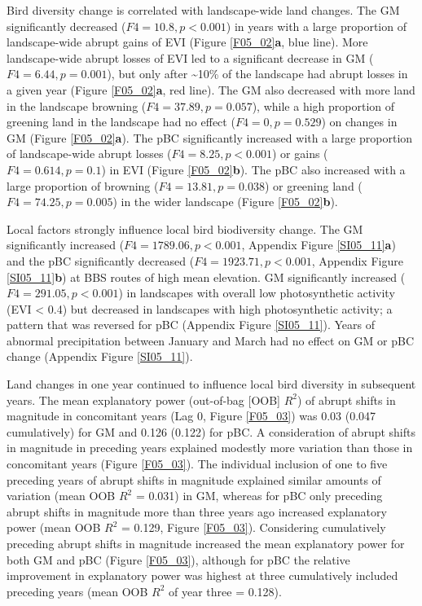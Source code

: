 Bird diversity change is correlated with landscape-wide land changes. The GM significantly decreased ($F4 = 10.8, p < 0.001$) in years with a large proportion of landscape-wide abrupt gains of EVI (Figure \ref{F05_02}\textbf{a}, blue line). More landscape-wide abrupt losses of EVI led to a significant decrease in GM ($F4 = 6.44, p = 0.001$), but only after \textasciitilde 10\% of the landscape had abrupt losses in a given year (Figure \ref{F05_02}\textbf{a}, red line). The GM also decreased with more land in the landscape browning ($F4 = 37.89, p = 0.057$), while a high proportion of greening land in the landscape had no effect ($F4 = 0, p = 0.529$) on changes in GM (Figure \ref{F05_02}\textbf{a}). The pBC significantly increased with a large proportion of landscape-wide abrupt losses ($F4 = 8.25, p < 0.001$) or gains ($F4 = 0.614, p = 0.1$) in EVI (Figure \ref{F05_02}\textbf{b}). The pBC also increased with a large proportion of browning ($F4 = 13.81, p = 0.038$) or greening land ($F4 = 74.25, p = 0.005$) in the wider landscape (Figure \ref{F05_02}\textbf{b}).

Local factors strongly influence local bird biodiversity change. The GM significantly increased ($F4 = 1789.06, p < 0.001$, Appendix Figure \ref{SI05_11}\textbf{a}) and the pBC significantly decreased ($F4 = 1923.71, p < 0.001$, Appendix Figure \ref{SI05_11}\textbf{b}) at BBS routes of high mean elevation. GM significantly increased ($F4 = 291.05, p < 0.001$) in landscapes with overall low photosynthetic activity (EVI < 0.4) but decreased in landscapes with high photosynthetic activity; a pattern that was reversed for pBC (Appendix Figure \ref{SI05_11}). Years of abnormal precipitation between January and March had no effect on GM or pBC change (Appendix Figure \ref{SI05_11}).

Land changes in one year continued to influence local bird diversity in subsequent years. The mean explanatory power (out-of-bag [OOB] $R^2$) of abrupt shifts in magnitude in concomitant years (Lag 0, Figure \ref{F05_03}) was 0.03 (0.047 cumulatively) for GM and 0.126 (0.122) for pBC. A consideration of abrupt shifts in magnitude in preceding years explained modestly more variation than those in concomitant years (Figure \ref{F05_03}). The individual inclusion of one to five preceding years of abrupt shifts in magnitude explained similar amounts of variation (mean OOB $R^2$ = 0.031) in GM, whereas for pBC only preceding abrupt shifts in magnitude more than three years ago increased explanatory power (mean OOB $R^2$ = 0.129, Figure \ref{F05_03}). Considering cumulatively preceding abrupt shifts in magnitude increased the mean explanatory power for both GM and pBC (Figure \ref{F05_03}), although for pBC the relative improvement in explanatory power was highest at three cumulatively included preceding years (mean OOB $R^2$ of year three = 0.128).

